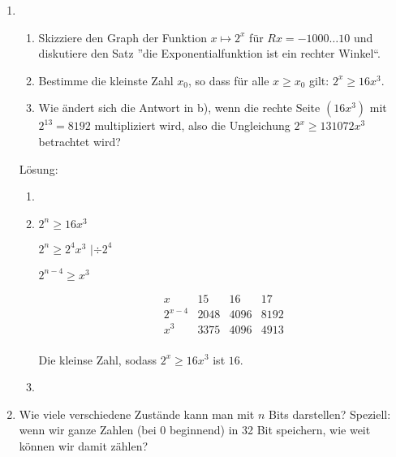 \documentclass[../main.tex]{subfiles}
\begin{document}
\begin{enumerate}
\begin{enumerate}
	      \end{enumerate}
	\item \begin{enumerate}
		      \item Skizziere den Graph der Funktion \( x \mapsto 2^x \) für \(Rx = -1000 \dots 10 \)
		            und diskutiere den Satz ”die Exponentialfunktion ist ein rechter Winkel“.
		      \item Bestimme die kleinste Zahl \( x_0 \), so dass für alle \( x \geq x_0 \)
		            gilt: \( 2^x \geq 16x^3 \).
		      \item Wie ändert sich die Antwort in b),
		            wenn die rechte Seite \( (16x^3) \) mit \( 2^{13} = 8192 \)
		            multipliziert wird, also die Ungleichung \( 2^x \geq 131072 x^3 \) betrachtet wird?
	      \end{enumerate}

	      Lösung:
	      \begin{enumerate}
		      \item
		      \item \( 2^n \geq 16x^3 \)

		            \( 2^n \geq 2^4x^3 \) \( | \div 2^4 \)

		            \( 2^{n-4} \geq x^3 \)

		            \[ \begin{array}{c|ccc}
				            x         & 15   & 16   & 17   \\
				            \hline
				            2^{x - 4} & 2048 & 4096 & 8192 \\
				            x^3       & 3375 & 4096 & 4913 \\
			            \end{array} \]

		            Die kleinse Zahl, sodass \( 2^x \geq 16x^3 \) ist \( 16 \).
		      \item
	      \end{enumerate}
	\item Wie viele verschiedene Zustände kann man mit \( n \) Bits darstellen?
	      Speziell: wenn wir ganze Zahlen (bei 0 beginnend) in 32 Bit speichern,
	      wie weit können wir damit zählen?


\end{enumerate}
\end{document}
